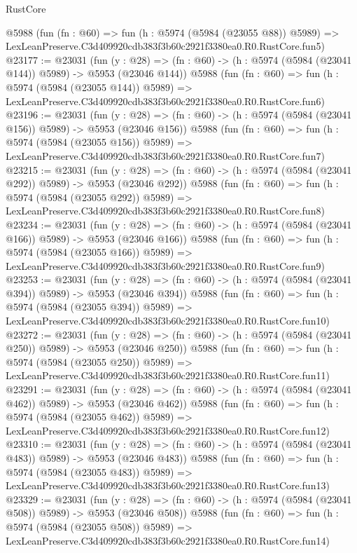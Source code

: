 \begin{lexlean}{RustCore}
\begin{coremodule}
    @5988
    (fun (fn : @60) =>
    fun (h : @5974 (@5984 (@23055 @88)) @5989) =>
    LexLeanPreserve.C3d409920cdb383f3b60c2921f3380ea0.R0.RustCore.fun5)
@23177 := @23031
    (fun (y : @28) => (fn : @60) -> (h : @5974 (@5984 (@23041 @144)) @5989) -> @5953 (@23046 @144))
    @5988
    (fun (fn : @60) =>
    fun (h : @5974 (@5984 (@23055 @144)) @5989) =>
    LexLeanPreserve.C3d409920cdb383f3b60c2921f3380ea0.R0.RustCore.fun6)
@23196 := @23031
    (fun (y : @28) => (fn : @60) -> (h : @5974 (@5984 (@23041 @156)) @5989) -> @5953 (@23046 @156))
    @5988
    (fun (fn : @60) =>
    fun (h : @5974 (@5984 (@23055 @156)) @5989) =>
    LexLeanPreserve.C3d409920cdb383f3b60c2921f3380ea0.R0.RustCore.fun7)
@23215 := @23031
    (fun (y : @28) => (fn : @60) -> (h : @5974 (@5984 (@23041 @292)) @5989) -> @5953 (@23046 @292))
    @5988
    (fun (fn : @60) =>
    fun (h : @5974 (@5984 (@23055 @292)) @5989) =>
    LexLeanPreserve.C3d409920cdb383f3b60c2921f3380ea0.R0.RustCore.fun8)
@23234 := @23031
    (fun (y : @28) => (fn : @60) -> (h : @5974 (@5984 (@23041 @166)) @5989) -> @5953 (@23046 @166))
    @5988
    (fun (fn : @60) =>
    fun (h : @5974 (@5984 (@23055 @166)) @5989) =>
    LexLeanPreserve.C3d409920cdb383f3b60c2921f3380ea0.R0.RustCore.fun9)
@23253 := @23031
    (fun (y : @28) => (fn : @60) -> (h : @5974 (@5984 (@23041 @394)) @5989) -> @5953 (@23046 @394))
    @5988
    (fun (fn : @60) =>
    fun (h : @5974 (@5984 (@23055 @394)) @5989) =>
    LexLeanPreserve.C3d409920cdb383f3b60c2921f3380ea0.R0.RustCore.fun10)
@23272 := @23031
    (fun (y : @28) => (fn : @60) -> (h : @5974 (@5984 (@23041 @250)) @5989) -> @5953 (@23046 @250))
    @5988
    (fun (fn : @60) =>
    fun (h : @5974 (@5984 (@23055 @250)) @5989) =>
    LexLeanPreserve.C3d409920cdb383f3b60c2921f3380ea0.R0.RustCore.fun11)
@23291 := @23031
    (fun (y : @28) => (fn : @60) -> (h : @5974 (@5984 (@23041 @462)) @5989) -> @5953 (@23046 @462))
    @5988
    (fun (fn : @60) =>
    fun (h : @5974 (@5984 (@23055 @462)) @5989) =>
    LexLeanPreserve.C3d409920cdb383f3b60c2921f3380ea0.R0.RustCore.fun12)
@23310 := @23031
    (fun (y : @28) => (fn : @60) -> (h : @5974 (@5984 (@23041 @483)) @5989) -> @5953 (@23046 @483))
    @5988
    (fun (fn : @60) =>
    fun (h : @5974 (@5984 (@23055 @483)) @5989) =>
    LexLeanPreserve.C3d409920cdb383f3b60c2921f3380ea0.R0.RustCore.fun13)
@23329 := @23031
    (fun (y : @28) => (fn : @60) -> (h : @5974 (@5984 (@23041 @508)) @5989) -> @5953 (@23046 @508))
    @5988
    (fun (fn : @60) =>
    fun (h : @5974 (@5984 (@23055 @508)) @5989) =>
    LexLeanPreserve.C3d409920cdb383f3b60c2921f3380ea0.R0.RustCore.fun14)

\end{coremodule}
\end{lexlean}
